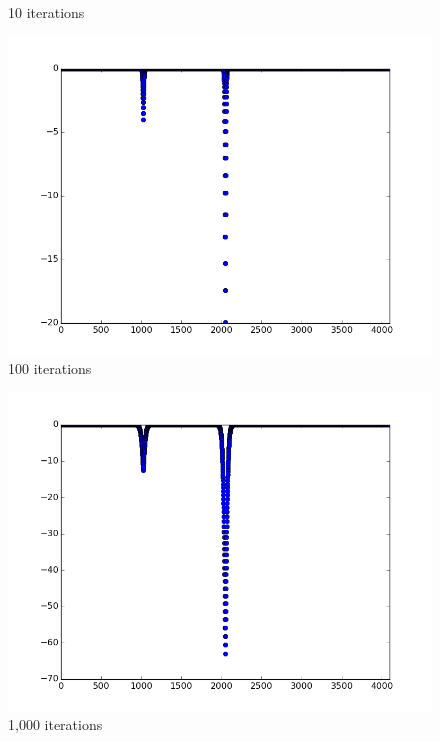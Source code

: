 \documentclass{article}
\begin{document}
\begin{figure}
\begin{minipage}{0.45\textwidth}
  10 iterations
\end{minipage}
\begin{minipage}{0.45\textwidth}
  \centering
  \includegraphics[width=1\linewidth, natwidth=800, natheight=600]{graphs/it100.png}\\
  100 iterations
\end{minipage}
\begin{minipage}{0.45\textwidth}
  \centering
  \includegraphics[width=1\linewidth, natwidth=800, natheight=600]{graphs/it1000.png}\\
  1,000 iterations
\end{minipage}
\begin{minipage}{0.45\textwidth}
  \centering

\end{minipage}
\end{figure}
\end{document}
